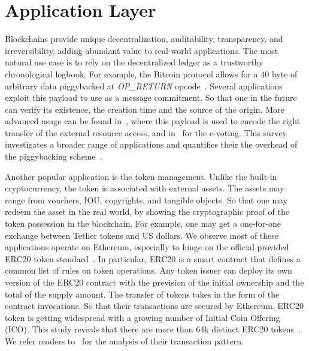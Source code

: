 \section{Application Layer}
Blockchains provide unique decentralization, auditability, transparency, and irreversibility, adding abundant value to real-world applications. 
The most natural use case is to rely on the decentralized ledger as a trustworthy chronological logbook. 
For example, the Bitcoin protocol allows for a 40 byte of arbitrary data piggybacked at \textit{OP\_RETURN} opcode~\cite{opreturn}.
Several applications exploit this payload to use as a message commitment. 
So that one in the future can verify its existence, the creation time and the source of the origin. 
More advanced usage can be found in~\cite{maesa2017blockchain}, where this payload is used to encode the right transfer of the external resource access, and in~\cite{wu2017voting} for the e-voting. 
This survey investigates a broader range of applications and quantifies their the overhead of the piggybacking scheme~\cite{bartoletti2017analysis}. 

Another popular application is the token management.
Unlike the built-in cryptocurrency, the token is associated with external assets. 
The assets may range from vouchers, IOU, copyrights, and tangible objects. 
So that one may redeem the asset in the real world, by showing the cryptographic proof of the token possession in the blockchain. 
For example, one may get a one-for-one exchange between Tether tokens and US dollars. 
We observe most of these applications operate on Ethereum, especially to hinge on the official provided ERC20 token standard~\cite{wiki:ERC20}.
In particular, ERC20 is a smart contract that defines a common list of rules on token operations.  
Any token issuer can deploy its own version of the ERC20 contract with the prevision of the initial ownership and the total of the supply amount. 
The transfer of tokens takes in the form of the contract invocations. 
So that their transactions are secured by Ethereum.
ERC20 token is getting widespread with a growing number of Initial Coin Offering (ICO). 
This study reveals that there are more than 64k distinct ERC20 tokens~\cite{victor2019measuring}.
We refer readers to~\cite{victor2019measuring,somin2018network,chen2020traveling} for the analysis of their transaction pattern. 

